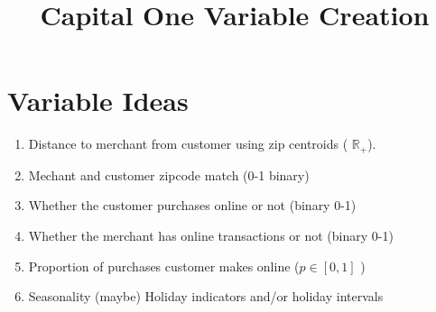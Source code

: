\documentclass{article}
\begin{document}
  \title{\bf Capital One Variable Creation}
  
 \maketitle

\section{Variable Ideas}

\begin{enumerate}
\item Distance to merchant  from customer using zip centroids ( $\mathbb{R}_+$). 
\item Mechant and customer zipcode match (0-1 binary)
\item Whether the customer purchases online or not (binary 0-1)
\item Whether the merchant has online transactions or not (binary 0-1)
\item Proportion of purchases customer makes online ($p \in [0,1]$ )
\item Seasonality (maybe) Holiday indicators and/or holiday intervals
\end{enumerate}
\end{document}
